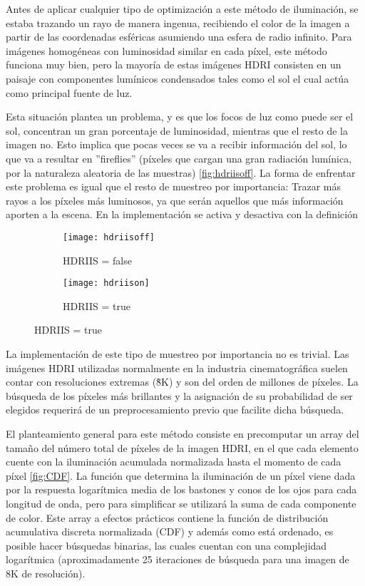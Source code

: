 Antes de aplicar cualquier tipo de optimización a este método de iluminación, se estaba trazando un rayo de manera ingenua, recibiendo el color de la imagen a partir de las coordenadas esféricas asumiendo una esfera de radio infinito. Para imágenes homogéneas con luminosidad similar en cada píxel, este método funciona muy bien, pero la mayoría de estas imágenes HDRI consisten en un paisaje con componentes lumínicos condensados tales como el sol el cual actúa como principal fuente de luz.

Esta situación plantea un problema, y es que los focos de luz como puede ser el sol, concentran un gran porcentaje de luminosidad, mientras que el resto de la imagen no. Esto implica que pocas veces se va a recibir información del sol, lo que va a resultar en ''fireflies'' (píxeles que cargan una gran radiación lumínica, por la naturaleza aleatoria de las muestras) \autoref{fig:hdriisoff}. La forma de enfrentar este problema es igual que el resto de muestreo por importancia: Trazar más rayos a los píxeles más luminosos, ya que serán aquellos que más información aporten a la escena. En la implementación se activa y desactiva con la definición 

\begin{figure}[H]
\label{fig:hdriis}
	\centering
  \begin{subfigure}[b]{0.4\textwidth}
	\texttt{[image: hdriisoff]}
	\caption{HDRIIS = false}
	\label{fig:hdriisoff}
  \end{subfigure}
  \hfill
  \begin{subfigure}[b]{0.4\textwidth}
	\texttt{[image: hdriison]}
	\caption{HDRIIS = true}
	\label{fig:hdriison}
  \end{subfigure}
\end{figure}

La implementación de este tipo de muestreo por importancia no es trivial. Las imágenes HDRI utilizadas normalmente en la industria cinematográfica suelen contar con resoluciones extremas (\~8K) y son del orden de millones de píxeles. La búsqueda de los píxeles más brillantes y la asignación de su probabilidad de ser elegidos requerirá de un preprocesamiento previo que facilite dicha búsqueda.

El planteamiento general para este método consiste en precomputar un array del tamaño del número total de píxeles de la imagen HDRI, en el que cada elemento cuente con la iluminación acumulada normalizada hasta el momento de cada píxel \autoref{fig:CDF}.
La función que determina la iluminación de un píxel viene dada por la respuesta logarítmica media de los bastones y conos de los ojos para cada longitud de onda, pero para simplificar se utilizará la suma de cada componente de color. Este array a efectos prácticos contiene la función de distribución acumulativa discreta normalizada (CDF) y además como está ordenado, es posible hacer búsquedas binarias, las cuales cuentan con una complejidad logarítmica (aproximadamente 25 iteraciones de búsqueda para una imagen de 8K de resolución).


